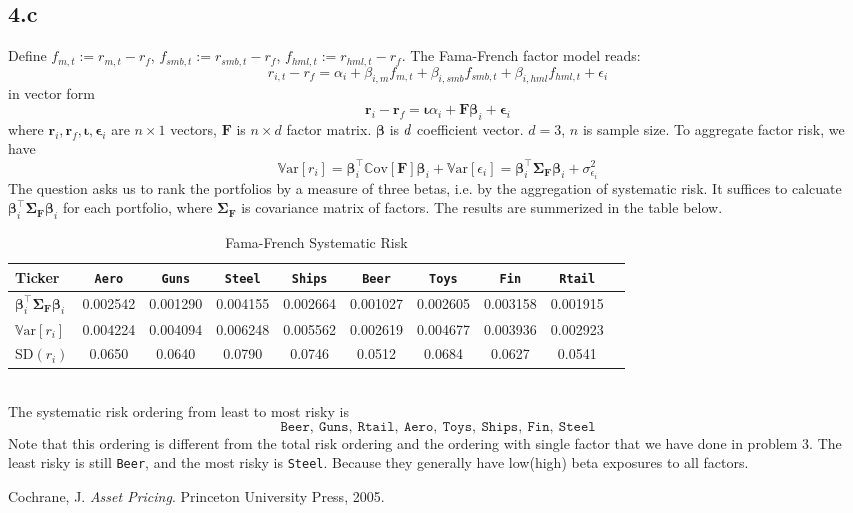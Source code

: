 \documentclass[10 pt]{hwtemplate} %
\begin{document}
\subsection*{4.c} Define $f_{m,t}:=r_{m,t}-r_f$, $f_{smb,t}:=r_{smb,t}-r_f$, $f_{hml,t}:=r_{hml,t}-r_f$. The Fama-French factor model reads:
\begin{equation}
  r_{i,t} - r_f =  \alpha_i + \beta_{i,m} f_{m,t}+ \beta_{i,smb} f_{smb,t} + \beta_{i,hml} f_{hml,t} + \epsilon_i
\end{equation}
in vector form
\begin{equation}
  \bm{r}_i - \bm{r}_f = \bm{\iota} \alpha_i + \bm{F} \bm{\beta}_i + \bm{\epsilon}_i
\end{equation}
where $\bm{r}_i, \bm{r}_f, \bm{\iota}, \bm{\epsilon}_i$ are $n\times 1$ vectors, $\bm{F}$ is $n\times d$ factor matrix. $\bm{\beta}$ is $d \time 1$ coefficient vector. $d=3$, $n$ is sample size. To aggregate factor risk, we have
$$
\mathrm{\mathbb{V}ar}\left[r_i\right] = \bm{\beta}_i^{\top} \mathrm{\mathbb{C}ov}\left[\bm{F}\right] \bm{\beta}_i + \mathrm{\mathbb{V}ar}\left[\epsilon_i\right] = \bm{\beta}_i^{\top} \bm{\Sigma}_{\bm{F}} \bm{\beta}_i + \sigma_{\epsilon_i}^2
$$
The question asks us to rank the portfolios by a measure of three betas, i.e. by the aggregation of systematic risk. It suffices to calcuate $\bm{\beta}_i^{\top} \bm{\Sigma}_{\bm{F}} \bm{\beta}_i$ for each portfolio, where $\bm{\Sigma}_{\bm{F}}$ is covariance matrix of factors. The results are summerized in the table below. 
\begin{table}[htbp]
  \begin{center}
  \captionsetup{justification=centering}
  \caption{\label{tab:risk1}Fama-French Systematic Risk}
  \small
    \begin{tabular}{lccccccccc}
    \toprule
      Ticker & \texttt{Aero} & \texttt{Guns} & \texttt{Steel}& \texttt{Ships}& \texttt{Beer}& \texttt{Toys}& \texttt{Fin}&  \texttt{Rtail}\\
      \midrule
      $\bm{\beta}_i^{\top} \bm{\Sigma}_{\bm{F}} \bm{\beta}_i$ &0.002542& 0.001290& 0.004155 & 0.002664 & 0.001027& 0.002605 & 0.003158 & 0.001915\\
      $\mathrm{\mathbb{V}ar}\left[r_i\right]$             & 0.004224    & 0.004094    & 0.006248     & 0.005562   & 0.002619    & 0.004677    & 0.003936 & 0.002923\\
      SD$(r_i)$             & 0.0650    & 0.0640    & 0.0790     & 0.0746   & 0.0512    & 0.0684    & 0.0627 & 0.0541\\
    \bottomrule
    \end{tabular}
  \end{center}
\end{table}
\\
The systematic risk ordering from least to most risky is
$$
\texttt{Beer},~\texttt{Guns},~\texttt{Rtail},~\texttt{Aero},~\texttt{Toys},~\texttt{Ships},~\texttt{Fin},~\texttt{Steel}
$$
Note that this ordering is different from the total risk ordering and the ordering with single factor that we have done in problem 3. The least risky is still \texttt{Beer}, and the most risky is \texttt{Steel}. Because they generally have low(high) beta exposures to all factors.


\begin{thebibliography}{}
Cochrane, J. 
\textit{Asset Pricing}. Princeton University Press, 2005.
\end{thebibliography}
\end{document}
